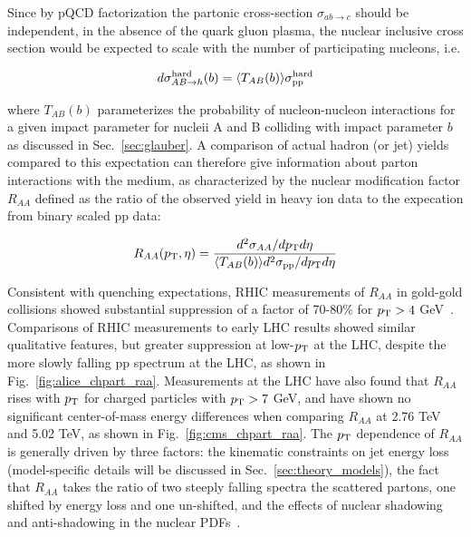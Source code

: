 Since by pQCD factorization the partonic cross-section $\sigma_{ab\rightarrow c}$ should be independent, in the absence of the quark gluon plasma, the nuclear inclusive cross section would be expected to scale with the number of participating nucleons, i.e.  

\begin{equation}
\label{eq:raa_p0}
d \sigma_{AB\rightarrow h}^{\rm hard}(b) = \langle T_{AB}(b) \rangle \sigma_{\rm pp}^{\rm hard}
\end{equation}

\noindent where $T_{AB}(b)$ parameterizes the probability of nucleon-nucleon interactions for a given impact parameter for nucleii A and B colliding with impact parameter $b$ as discussed in Sec.~\ref{sec:glauber}.  A comparison of actual hadron (or jet) yields compared to this expectation can therefore give information about parton interactions with the medium, as characterized by the nuclear modification factor $R_{AA}$ defined as the ratio of the observed yield in heavy ion data to the expecation from binary scaled pp data: 

\begin{equation}
\label{eq:raa_trk}
R_{AA}(p_{\rm T}, \eta) = \frac{d^{2}\sigma_{AA}/dp_{\rm T} d\eta}{\langle T_{AB}(b) \rangle  d^{2}\sigma_{\rm pp}/dp_{\rm T} d\eta}
\end{equation}

Consistent with quenching expectations, RHIC measurements of $R_{AA}$ in gold-gold collisions showed substantial suppression of a factor of 70-80\% for $p_{\rm T} > 4$ GeV~\cite{Arsene:2004fa, Adcox:2004mh, Back:2004je, Adams:2005dq}.  Comparisons of RHIC measurements to early LHC results showed similar qualitative features, but greater suppression at low-$p_{\rm T}$ at the LHC, despite the more slowly falling pp spectrum at the LHC, as shown in Fig.~\ref{fig:alice_chpart_raa}.  Measurements at the LHC have also found that $R_{AA}$ rises with $p_{\rm T}$ for charged particles with $p_{\rm T} > 7$ GeV, and have shown no significant center-of-mass energy differences when comparing $R_{AA}$ at 2.76 TeV and 5.02 TeV, as shown in Fig.~\ref{fig:cms_chpart_raa}.  The $p_{\rm T}$ dependence of $R_{AA}$ is generally driven by three factors:  the kinematic constraints on jet energy loss (model-specific details will be discussed in Sec.~\ref{sec:theory_models}), the fact that $R_{AA}$ takes the ratio of two steeply falling spectra the scattered partons, one shifted by energy loss and one un-shifted, and the effects of nuclear shadowing and anti-shadowing in the nuclear PDFs~\cite{d'Enterria:2009am, Armesto:2006ph}.


